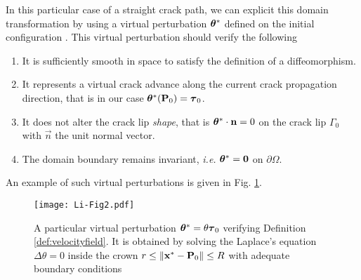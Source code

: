 In this particular case of a straight crack path, we can explicit this domain transformation by using a virtual perturbation $\vtheta^*$ defined on the initial configuration \cite{Destuynder:1981,KhludnevSokolowskiSzulc:2010}. This virtual perturbation should verify the following
\begin{definition} \label{def:velocityfield}
\begin{enumerate}
\item It is sufficiently smooth in space to satisfy the definition of a diffeomorphism.
\item It represents a virtual crack advance along the current crack propagation direction, that is in our case $\vtheta^*(\vec{P}_0)=\vtau_0$.
\item It does not alter the crack lip \emph{shape}, that is $\vtheta^*\cdot\vec{n}=0$ on the crack lip $\Gamma_0$ with $\vec{n}$ the unit normal vector.
\item The domain boundary remains invariant, \emph{i.e.} $\vtheta^*=\vec{0}$ on $\partial\Omega$.
\end{enumerate}
An example of such virtual perturbations is given in Fig. \ref{fig:exampletheta}.
\end{definition}
\begin{figure}[htbp]\sidecaption
\centering
\texttt{[image: Li-Fig2.pdf]}
\caption{A particular virtual perturbation $\vtheta^*=\theta\vtau_0$ verifying Definition \ref{def:velocityfield}. It is obtained by solving the Laplace's equation $\Delta\theta=0$ inside the crown $r\leq\norm{\vec{x}^*-\vec{P}_0}\leq R$ with adequate boundary conditions} \label{fig:exampletheta}
\end{figure}

